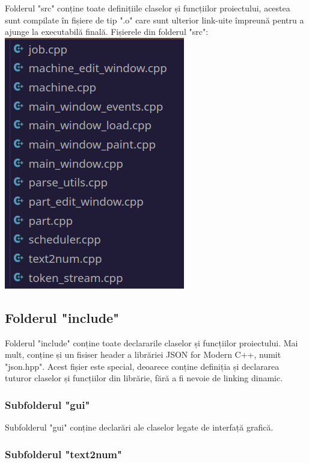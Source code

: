 \documentclass[12pt, twoside]{article}
\begin{document}
Folderul "src" conține toate definițiile
claselor și funcțiilor proiectului, acestea sunt compilate în
fișiere de tip ".o" care sunt ulterior link-uite
împreună pentru a ajunge la executabilă finală.
Fișierele din folderul "src":
\newline
\includegraphics[scale=0.6]{sources.png}
\newline

\subsection{Folderul "include"}

Folderul "include" conține toate declararile claselor și
funcțiilor proiectului. Mai mult, conține și un fisiser
header a librăriei JSON for Modern C++, numit
"json.hpp". Acest fișier este special, deoarece conține
definiția și declararea tuturor claselor și funcțiilor din
librărie, fără a fi nevoie de linking dinamic.

\subsubsection{Subfolderul "gui"}

Subfolderul "gui" conține declarări ale claselor legate
de interfață grafică.

\subsubsection{Subfolderul "text2num"}
\end{document}
